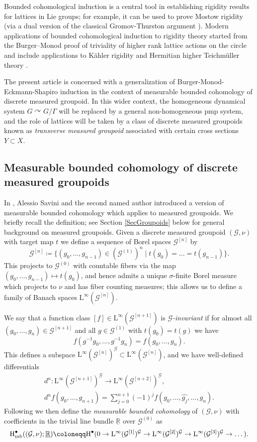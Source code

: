 \documentclass[11pt, oneside]{amsart}
\theoremstyle{definition}
\theoremstyle{remark}
\theoremstyle{TheoremNum}
\newcommand{\Hm}{\textup{H}}
\newcommand{\Hmb}{\textup{H}_{\textup{mb}}}
\newcommand{\Linf}{\mathrm{L}^{\infty}}
\newcommand{\cG}{\mathcal{G}}
\newcommand{\bR}{\mathbb{R}}
\begin{document}
Bounded cohomological induction is a central tool in establishing rigidity results for lattices in Lie groups; for example, it can be used to prove Mostow rigidity (via a dual version of the classical Gromov-Thurston argument \cite{BurgerBucherIozziRigidity}). Modern applications of bounded cohomological induction to rigidity theory started from the Burger--Monod proof of triviality of higher rank lattice actions on the circle \cite{BuMo} and include applications to K\"ahler rigidity \cite{BIKahler} and Hermitian higher Teichm\"uller theory \cite{BIWSurvey}. 

The present article is concerned with a generalization of Burger-Monod-Eckmann-Shapiro induction in the context of measurable bounded cohomology of discrete measured groupoid. In this wider context, the homogeneous dynamical system $G \curvearrowright G/\Gamma$ will be replaced by a general non-homogeneous pmp system, and the role of lattices will be taken by a class of discrete measured groupoids known as \emph{transverse measured groupoid} associated with certain cross sections $Y \subset X$.

\subsection{Measurable bounded cohomology of discrete measured groupoids}
In \cite{sarti:savini:23, sarti:savini25}, Alessio Savini and the second named author introduced a version of measurable bounded cohomology which applies to measured groupoids. We briefly recall the definition; see Section \ref{SecGroupoids} below for general background on measured groupoids. Given a discrete measured groupoid $(\cG, \nu)$ with target map $t$ we define a sequence of Borel spaces $\cG^{[n]}$ by
\[
\cG^{[n]} \coloneqq \{(g_0, \dots, g_{n-1}) \in (\cG^{(1)})^n \mid t(g_0) = \dots = t(g_{n-1})\}.
\]
This projects to $\cG^{(0)}$ with countable fibers via the map $(g_0, \dots, g_{n-1}) \mapsto t(g_0)$, and hence admits a unique $\sigma$-finite Borel measure which projects to $\nu$ and has fiber counting measures; this allows us to define a family of Banach spaces $\Linf(\cG^{[n]})$. 

We say that a function class $[f] \in \Linf(\cG^{[n+1]})$ is \emph{$\cG$-invariant} if for almost all $(g_0, \dots, g_n) \in \cG^{[n+1]}$ and all  $g \in \cG^{(1)}$ with $t(g_0) = t(g)$ we have
\[
f(g^{-1}g_0, \dots, g^{-1}g_n) = f(g_0, \dots, g_n).
\]
This defines a subspace  $\Linf(\cG^{[n]})^{\cG}  \subset \Linf(\cG^{[n]})$, and we have well-defined differentials
\begin{gather*}
d^n: \Linf(\cG^{[n+1]})^{\cG} \to \Linf(\cG^{[n+2]})^{\cG},\\
 d^nf(g_0, \dots, g_{n+1}) = \sum_{j=0}^{n+1}(-1)^j f(g_0, \dots, \widehat{g_j}, \dots, g_n).
\end{gather*}
Following \cite{sarti:savini:23} we then define the \emph{measurable bounded cohomology} of $(\cG, \nu)$ with coefficients in the trivial line bundle $\underline{\bR}$ over $\cG^{(0)}$ as
\[
\Hmb^\bullet((\cG,\nu); \underline{\bR}) \coloneqq \Hm^\bullet(0 \to  \Linf(\cG^{[1]})^{\cG} \to  \Linf(\cG^{[2]})^{\cG} \to  \Linf(\cG^{[3]})^{\cG} \to \dots).
\]
\end{document}
